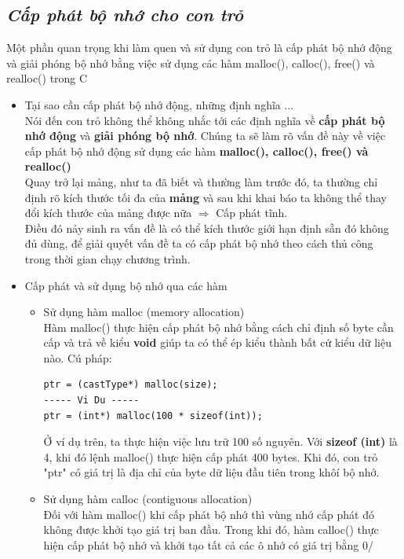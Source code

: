\documentclass[12pt,a4paper]{article}
\begin{document}
\begin{itemize}
\begin{center}
	\subsection*{\textbf{\textit{Cấp phát bộ nhớ cho con trỏ}}}
\end{center}
Một phần quan trọng khi làm quen và sử dụng con trỏ là cấp phát bộ nhớ động và giải phóng bộ nhớ bằng việc sử dụng các hàm malloc(), calloc(), free() và realloc() trong C
\begin{itemize}
\item Tại sao cần cấp phát bộ nhớ động, những định nghĩa ...\\
Nói đến con trỏ không thể không nhắc tới các định nghĩa về \textbf{cấp phát bộ nhớ động} và \textbf{giải phóng bộ nhớ}. Chúng ta sẽ làm rõ vấn đề này về việc cấp phát bộ nhớ động sử dụng các hàm \textbf{malloc(), calloc(), free() và realloc()}\\
Quay trở lại mảng, như ta đã biết và thường làm trước đó, ta thường chỉ định rõ kích thước tối đa của \textbf{mảng} và sau khi khai báo ta không thể thay đổi kích thước của mảng được nữa $\Rightarrow$ Cấp phát tĩnh.\\
Điều đó nảy sinh ra vấn đề là có thể kích thước giới hạn định sẵn đó không đủ dùng, để giải quyết vấn đề ta có cấp phát bộ nhớ theo cách thủ công trong thời gian chạy chương trình.
\item Cấp phát và sử dụng bộ nhớ qua các hàm\\
\begin{itemize}
\item Sử dụng hàm malloc (memory allocation)\\
Hàm malloc() thực hiện cấp phát bộ nhớ bằng cách chỉ định số byte cần cấp và trả về kiểu \textbf{void} giúp ta có thể ép kiểu thành bất cứ kiểu dữ liệu nào. Cú pháp: 
\begin{lstlisting}
ptr = (castType*) malloc(size);
----- Vi Du -----
ptr = (int*) malloc(100 * sizeof(int));
\end{lstlisting}	
Ở ví dụ trên, ta thực hiện việc lưu trữ 100 số nguyên. Với \textbf{sizeof (int)} là 4, khi đó lệnh malloc() thực hiện cấp phát 400 bytes. Khi đó, con trỏ "ptr" có giá trị là địa chỉ của byte dữ liệu đầu tiên trong khôí bộ nhớ.
\item Sử dụng hàm calloc (contiguous allocation)\\
Đối với hàm malloc() khi cấp phát bộ nhớ thì vùng nhớ cấp phát đó không được khởi tạo giá trị ban đầu. Trong khi đó, hàm calloc() thực hiện cấp phát bộ nhớ và khởi tạo tất cả các ô nhớ có giá trị bằng 0/

\end{itemize}
\end{itemize}
\end{itemize}
\end{document}
